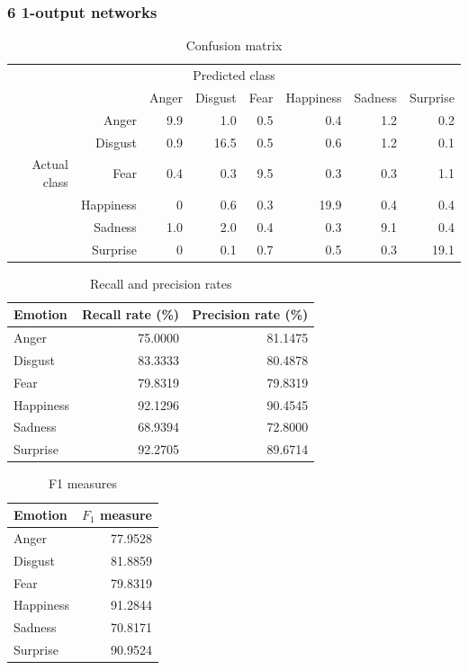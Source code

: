 \documentclass[12pt]{article}
\begin{document}
\subsubsection*{6 1-output networks}

\begin{table}
\centering
\begin{tabular}{r r | r r r r r r}
\multicolumn{8}{c}{Predicted class} \\
&  & Anger & Disgust & Fear & Happiness & Sadness & Surprise \\
\hline
 & Anger            & 9.9 & 1.0  & 0.5 & 0.4  & 1.2 & 0.2  \\
 & Disgust          & 0.9 & 16.5 & 0.5 & 0.6  & 1.2 & 0.1  \\
Actual class & Fear & 0.4 & 0.3  & 9.5 & 0.3  & 0.3 & 1.1  \\
 & Happiness        & 0   & 0.6  & 0.3 & 19.9 & 0.4 & 0.4  \\
 & Sadness          & 1.0 & 2.0  & 0.4 & 0.3  & 9.1 & 0.4  \\
 & Surprise         & 0   & 0.1  & 0.7 & 0.5  & 0.3 & 19.1 \\
\end{tabular}
\caption{Confusion matrix}
\end{table}

\begin{table}
\centering
\begin{tabular}{l | r r}
Emotion & Recall rate (\%) & Precision rate (\%) \\
\hline
Anger     & 75.0000 & 81.1475 \\
Disgust   & 83.3333 & 80.4878 \\
Fear      & 79.8319 & 79.8319 \\
Happiness & 92.1296 & 90.4545 \\
Sadness   & 68.9394 & 72.8000 \\
Surprise  & 92.2705 & 89.6714 \\
\end{tabular}
\caption{Recall and precision rates}
\end{table}

\begin{table}
\centering
\begin{tabular}{l | r}
Emotion & \( F_1 \) measure \\
\hline
Anger     & 77.9528 \\
Disgust   & 81.8859 \\
Fear      & 79.8319 \\
Happiness & 91.2844 \\
Sadness   & 70.8171 \\
Surprise  & 90.9524 \\
\end{tabular}
\caption{F1 measures}
\end{table}
\end{document}
